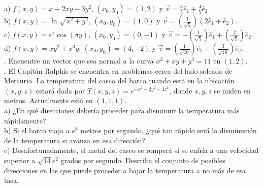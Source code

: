 \documentclass[letterpaper]{article}
\renewcommand{\*}{\cdot}
\theoremstyle{definition}
\begin{document}
a) $f(x,y) = x + 2xy -3y^2$, $(x_0, y_0) = (1,2)$ y $\vec{v} = \frac{3}{5}\hat{e}_1 + \frac{4}{5}\hat{e}_2 $.\\

b) $f(x,y) = \ln{\sqrt{x^2 + y^2}}$, $(x_0, y_0) = (1,0)$ y $\vec{v} = \left( \frac{1}{\sqrt{5}} \right)(2\hat{e}_1 + \hat{e}_2 )$.\\

c) $f(x,y) = e^x\cos{(\pi y)}$, $(x_0, y_0) = (0,-1)$ y $\vec{v} = - \left( \frac{1}{\sqrt{5}} \right)\hat{e}_1 +  \left( \frac{2}{\sqrt{5}} \right)\hat{e}_2 $.\\

d) $f(x,y) = xy^2 + x^3y$, $(x_0, y_0) = (4,-2)$ y $\vec{v} =  \left( \frac{1}{\sqrt{10}} \right)\hat{e}_1 +  \left( \frac{3}{\sqrt{10}} \right)\hat{e}_2 $.\\


. Encuentre un vector que sea normal a la curva $x^3 + xy + y^3 = 11$ en  $(1,2)$.\\

.  El Capitán Ralphis se encuentra en problemas cerca del lado soleado de Mercurio. La temperatura del casco del barco cuando está en la ubicación $(x, y, z)$ estará dada por $T(x,y,z) = e^{-x^2 - 2y^2 - 3z^2}$, donde $x,y,z$ se miden en metros. Actualmente está en $(1,1,1)$.\\

a) ¿En qué direcciones debería proceder para disminuir la temperatura más rápidamente?\\

b) Si el barco viaja a $e^8$ metros por segundo, ¿qué tan rápido será la disminución de la temperatura si avanza en esa dirección?\\

c) Desafortunadamente, el metal del casco se romperá si se enfría a una velocidad superior a $\sqrt{14}e^2$ grados por segundo. Describa el conjunto de posibles direcciones en las que puede proceder a bajar la temperatura a no más de esa tasa.\\
\end{document}
